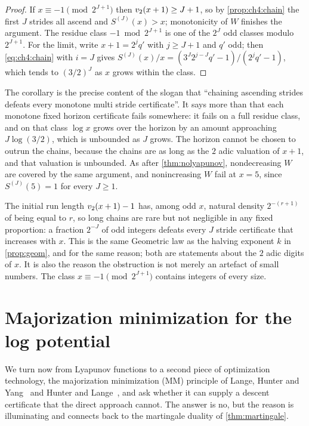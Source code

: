 \begin{proof}
If $x\equiv-1\pmod{2^{J+1}}$ then $v_2(x+1)\ge J+1$, so by
\cref{prop:ch4:chain} the first $J$ strides all ascend and
$S^{(J)}(x)>x$; monotonicity of $W$ finishes the argument.  The residue class
$-1\bmod2^{J+1}$ is one of the $2^{J}$ odd classes modulo $2^{J+1}$.  For the
limit, write $x+1=2^{j}q'$ with $j\ge J+1$ and $q'$ odd; then
\eqref{eq:ch4:chain} with $i=J$ gives
$S^{(J)}(x)/x=(3^J2^{j-J}q'-1)/(2^jq'-1)$, which tends to $(3/2)^J$ as $x$
grows within the class.
\end{proof}

The corollary is the precise content of the slogan that ``chaining ascending
strides defeats every monotone multi stride certificate''.  It says more than that each
monotone fixed horizon certificate fails somewhere: it fails on a full residue class,
and on that class $\log x$ grows over the horizon by an amount
approaching $J\log(3/2)$, which is unbounded as $J$ grows.  The
horizon cannot be chosen to outrun the chains, because the chains are as long
as the $2$ adic valuation of $x+1$, and that valuation is unbounded.
As after \cref{thm:nolyapunov}, nondecreasing $W$ are covered by the same argument, and nonincreasing $W$ fail at $x=5$, since $S^{(J)}(5)=1$ for every $J\ge1$.

\begin{remark}\label{rem:ch4:distribution}
The initial run length $v_2(x+1)-1$ has, among odd $x$, natural density
$2^{-(r+1)}$ of being equal to $r$, so long chains are rare but not negligible
in any fixed proportion: a fraction $2^{-J}$ of odd integers defeats every
$J$ stride certificate that increases with $x$.  This is the same Geometric law as the halving
exponent $k$ in \cref{prop:geom}, and for the same reason; both are statements
about the $2$ adic digits of $x$.  It is also the reason the obstruction is not
merely an artefact of small numbers.  The class $x\equiv-1\pmod{2^{J+1}}$
contains integers of every size.
\end{remark}

\section{Majorization minimization for the log potential}\label{sec:ch4:mm}

We turn now from Lyapunov functions to a second piece of optimization
technology, the majorization minimization (MM) principle of Lange, Hunter and
Yang~\cite{lange2000} and Hunter and Lange~\cite{hunter2004}, and ask whether
it can supply a descent certificate that the direct approach cannot.  The
answer is no, but the reason is illuminating and connects back to the
martingale duality of \cref{thm:martingale}.

